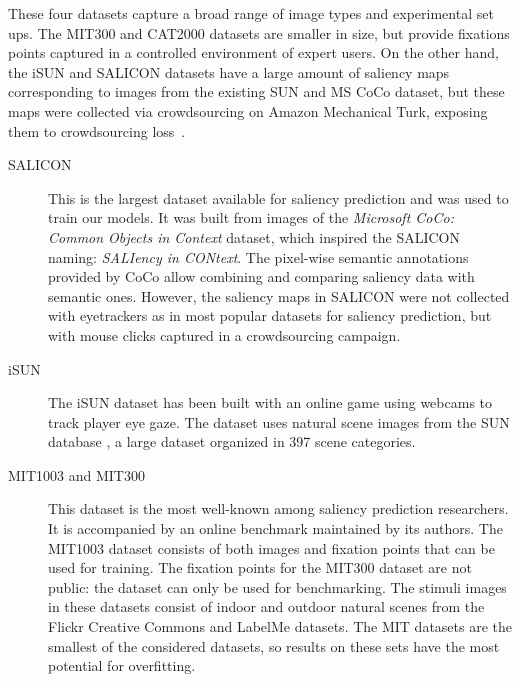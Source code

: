 \documentclass[10pt,twocolumn,letterpaper]{article}
\begin{document}
These four datasets capture a broad range of image types and experimental set ups.
The MIT300 and CAT2000 datasets are smaller in size, but provide fixations points captured in a controlled environment of expert users. 
On the other hand, the iSUN and SALICON datasets have a large amount of saliency maps corresponding to images from the existing SUN and MS CoCo dataset, but these maps were collected via crowdsourcing on Amazon Mechanical Turk, exposing them to crowdsourcing loss~\cite{carlier2015assessment}.

\begin{description}
\item[SALICON \cite{jiang2015salicon} ] This is the largest dataset available for saliency prediction and was used to train our models.
It was built from images of the \textit{Microsoft CoCo: Common Objects in Context} \cite{lin2014microsoft} dataset, which inspired the SALICON naming: \textit{SALIency in CONtext}. The pixel-wise semantic annotations provided by CoCo allow combining and comparing saliency data with semantic ones.
However, the saliency maps in SALICON were not collected with eyetrackers as in most popular datasets for saliency prediction, but with mouse clicks captured in a crowdsourcing campaign.
\item[iSUN \cite{xu2015turkergaze}] The iSUN dataset has been built with an online game using  webcams to track player eye gaze. The dataset uses natural scene images from the SUN database \cite{xiao2010sun}, a large dataset  organized in 397 scene categories.
\item[MIT1003 and MIT300 \cite{judd2009learning}] This dataset is the most well-known among saliency prediction researchers. It is accompanied by an online benchmark maintained by its authors.
The MIT1003 dataset consists of both images and fixation points that can be used for training. The fixation points for the MIT300 dataset are not public: the dataset can only be used for benchmarking.
The stimuli images in these datasets consist of indoor and outdoor natural scenes from the Flickr Creative Commons and LabelMe \cite{russell2008labelme} datasets. The MIT datasets are the smallest of the considered datasets, so results on these sets have the most potential for overfitting. %
\end{description}\begin{table*}
\begin{center}
\begin{tabular}{lllllll}

\end{tabular}
\end{center}
\end{table*}
\end{document}
